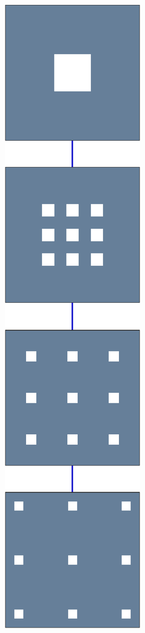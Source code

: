 
\begin{figure}[!ht]\centering
\begin{subfigure}[b]{0.085\textwidth}\centering
	\includegraphics[width=\textwidth]{figures/exple-better-support/tree_classic.pdf}

\end{subfigure}
\end{figure}
